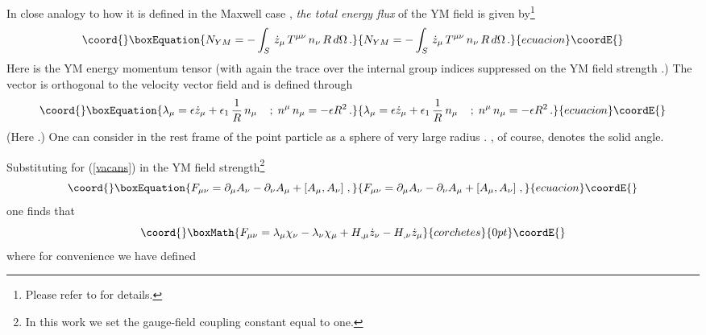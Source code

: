 \documentclass[a4paper,twocolumn,prd,showpacs,amsmath,amssymb]{revtex4}
\begin{document}
In close analogy to how it is defined in the Maxwell case
\cite{bar}, {\it the total energy flux} of the YM field is
given by\footnote{Please refer to \cite{gs1} for details.}
\begin{equation}\coord{}\boxEquation{
N_{YM} = - \int_{S} \, \dot{z}_{\mu} \, T^{\mu \nu} \, n_{\nu} \, R \, d\Omega \, .
\label{flux}
}{
N_{YM} = - \int_{S} \, \dot{z}_{\mu} \, T^{\mu \nu} \, n_{\nu} \, R \, d\Omega \, .
}{ecuacion}\coordE{}\end{equation}
Here \coordHE{} is the YM energy
momentum tensor (with again the trace over the internal group indices
suppressed on the YM field strength \coordHE{}.) The vector \coordHE{} is orthogonal
to the velocity vector field \coordHE{} and is defined through
\begin{equation}\coord{}\boxEquation{
\lambda_{\mu} = \epsilon \dot{z}_{\mu} + \epsilon_{1} \, \frac{1}{R} \, n_{\mu}
\;\;\;\; ; \; n^{\mu} \, n_{\mu} = - \epsilon R^2 \, . \label{lamzn}
}{
\lambda_{\mu} = \epsilon \dot{z}_{\mu} + \epsilon_{1} \, \frac{1}{R} \, n_{\mu}
\;\;\;\; ; \; n^{\mu} \, n_{\mu} = - \epsilon R^2 \, . }{ecuacion}\coordE{}\end{equation}
(Here \coordHE{}.) One can consider \coordHE{} in the rest frame of the
point particle as a sphere \coordHE{} of very large radius \coordHE{}. \coordHE{}, of course,
denotes the solid angle.

Substituting for \coordHE{} (\ref{vacans}) in the YM field strength\footnote{In
this work we set the gauge-field coupling constant equal to one.}
\begin{equation}\coord{}\boxEquation{
F_{\mu\nu} = \partial_{\mu} A_{\nu} - \partial_{\nu} A_{\mu}
+ [A_{\mu}, A_{\nu}] \; , \label{fmn}
}{
F_{\mu\nu} = \partial_{\mu} A_{\nu} - \partial_{\nu} A_{\mu}
+ [A_{\mu}, A_{\nu}] \; , }{ecuacion}\coordE{}\end{equation}
one finds that
\[\coord{}\boxMath{ F_{\mu\nu} = \lambda_{\mu} \chi_{\nu} - \lambda_{\nu} \chi_{\mu}
+ H_{,\mu} \dot{z}_{\nu} - H_{,\nu} \dot{z}_{\mu}}{corchetes}{0pt}\coordE{}\]
where for convenience we have defined
\coordHE{}
\end{document}
